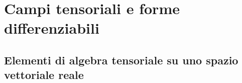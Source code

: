 \chapter{Campi tensoriali e forme differenziabili}
    \section{Elementi di algebra tensoriale su uno spazio vettoriale reale}